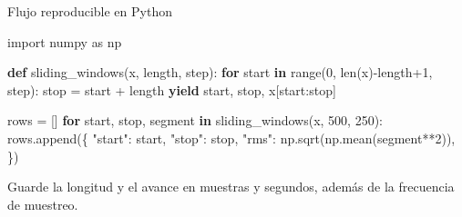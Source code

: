 \documentclass[
  ignorenonframetext,
  aspectratio=169,
  spanish,
  professionalfonts]{beamer}
\newenvironment{Shaded}{\begin{snugshade}}{\end{snugshade}}
\newcommand{\BuiltInTok}[1]{\textcolor[rgb]{0.00,0.23,0.31}{#1}}
\newcommand{\ControlFlowTok}[1]{\textcolor[rgb]{0.00,0.23,0.31}{\textbf{#1}}}
\newcommand{\DecValTok}[1]{\textcolor[rgb]{0.68,0.00,0.00}{#1}}
\newcommand{\ImportTok}[1]{\textcolor[rgb]{0.00,0.46,0.62}{#1}}
\newcommand{\KeywordTok}[1]{\textcolor[rgb]{0.00,0.23,0.31}{\textbf{#1}}}
\newcommand{\NormalTok}[1]{\textcolor[rgb]{0.00,0.23,0.31}{#1}}
\newcommand{\OperatorTok}[1]{\textcolor[rgb]{0.37,0.37,0.37}{#1}}
\newcommand{\StringTok}[1]{\textcolor[rgb]{0.13,0.47,0.30}{#1}}
\begin{document}
\begin{frame}{Flujo reproducible en Python}
\protect{}\label{flujo-reproducible-en-python}
\begin{Shaded}
\begin{Highlighting}[]
\ImportTok{import}\NormalTok{ numpy }\ImportTok{as}\NormalTok{ np}

\KeywordTok{def}\NormalTok{ sliding\_windows(x, length, step):}
    \ControlFlowTok{for}\NormalTok{ start }\KeywordTok{in} \BuiltInTok{range}\NormalTok{(}\DecValTok{0}\NormalTok{, }\BuiltInTok{len}\NormalTok{(x)}\OperatorTok{{-}}\NormalTok{length}\OperatorTok{+}\DecValTok{1}\NormalTok{, step):}
\NormalTok{        stop }\OperatorTok{=}\NormalTok{ start }\OperatorTok{+}\NormalTok{ length}
        \ControlFlowTok{yield}\NormalTok{ start, stop, x[start:stop]}

\NormalTok{rows }\OperatorTok{=}\NormalTok{ []}
\ControlFlowTok{for}\NormalTok{ start, stop, segment }\KeywordTok{in}\NormalTok{ sliding\_windows(x, }\DecValTok{500}\NormalTok{, }\DecValTok{250}\NormalTok{):}
\NormalTok{    rows.append(\{}
        \StringTok{"start"}\NormalTok{: start,}
        \StringTok{"stop"}\NormalTok{: stop,}
        \StringTok{"rms"}\NormalTok{: np.sqrt(np.mean(segment}\OperatorTok{**}\DecValTok{2}\NormalTok{)),}
\NormalTok{    \})}
\end{Highlighting}
\end{Shaded}

\begin{tcolorbox}[enhanced jigsaw, arc=.35mm, bottomrule=.15mm, bottomtitle=1mm, breakable, colback=white, colbacktitle=quarto-callout-tip-color!10!white, colframe=quarto-callout-tip-color-frame, coltitle=black, left=2mm, leftrule=.75mm, opacityback=0, opacitybacktitle=0.6, rightrule=.15mm, title={Reproducibilidad}, titlerule=0mm, toprule=.15mm, toptitle=1mm]

Guarde la longitud y el avance en muestras y segundos, además de la
frecuencia de muestreo.

\end{tcolorbox}
\end{frame}
\end{document}
